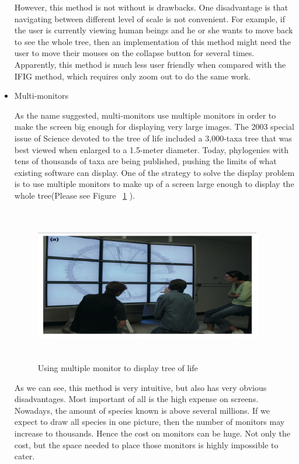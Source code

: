 \documentclass[a4paper,11pt,twoside]{report}
\begin{document}
\begin{itemize}
However, this method is not without is drawbacks. One disadvantage is that navigating between different level of scale is not convenient. For example, if the user is currently viewing human beings and he or she wants to move back to see the whole tree, then an implementation of this method might need the user to move their mouses on the collapse button for several times. Apparently, this method is much less user friendly when compared with the IFIG method, which requires only zoom out to do the same work.

  \item Multi-monitors

  As the name suggested, multi-monitors use multiple monitors in order to make the screen big enough for displaying very large images. The 2003 special issue of Science devoted to the tree of life included a 3,000-taxa tree that was best viewed when enlarged to a 1.5-meter diameter.\cite{multipleMonitoring} Today, phylogenies with tens of thousands of taxa are being published\cite{multipleMonitoring2}, pushing the limits of what existing software can display. One of the strategy to solve the display problem is to use multiple monitors to make up of a screen large enough to display the whole tree(Please see Figure ~\ref{fig:multipleMonitoring} ).
  
  \begin{figure}[H]
  \centering
  \includegraphics [width=10cm,height=6.8cm]{MultipleMonitoring}
  \caption{Using multiple monitor to display tree of life}
  \label{fig:multipleMonitoring}
\end{figure}
  
  As we can see, this method is very intuitive, but also has very obvious disadvantages. Most important of all is the high expense on screens. Nowadays, the amount of species known is above several millions. If we expect to draw all species in one picture, then the number of monitors may increase to thousands. Hence the cost on monitors can be huge. Not only the cost, but the space needed to place those monitors is highly impossible to cater.
  

\end{itemize}
\end{document}
